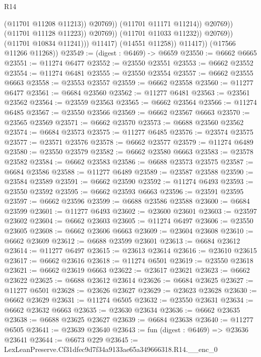 \begin{lexlean}{R14}
\begin{coremodule}
                                          (@11701 @11208 @11213))
                                        @20769))
                                    (@11701 @11171 @11214))
                                  @20769))
                              (@11701 @11128 @11223))
                            @20769))
                        (@11701 @11033 @11232))
                      @20769))
                  (@11701 @10834 @11241)))
              @11417)
            (@14551 @11258))
          @11417))
      (@17566 @11266 @11268))
@23549 := (digest : @6469) -> @6659
@23550 := @6662 @6665
@23551 := @11274 @6477
@23552 := @23550 @23551
@23553 := @6662 @23552
@23554 := @11274 @6481
@23555 := @23550 @23554
@23557 := @6662 @23555 @6663
@23558 := @23553 @23557
@23559 := @6662 @23558
@23560 := @11277 @6477
@23561 := @6684 @23560
@23562 := @11277 @6481
@23563 := @23561 @23562
@23564 := @23559 @23563
@23565 := @6662 @23564
@23566 := @11274 @6485
@23567 := @23550 @23566
@23569 := @6662 @23567 @6663
@23570 := @23565 @23569
@23571 := @6662 @23570
@23573 := @6688 @23560 @23562
@23574 := @6684 @23573
@23575 := @11277 @6485
@23576 := @23574 @23575
@23577 := @23571 @23576
@23578 := @6662 @23577
@23579 := @11274 @6489
@23580 := @23550 @23579
@23582 := @6662 @23580 @6663
@23583 := @23578 @23582
@23584 := @6662 @23583
@23586 := @6688 @23573 @23575
@23587 := @6684 @23586
@23588 := @11277 @6489
@23589 := @23587 @23588
@23590 := @23584 @23589
@23591 := @6662 @23590
@23592 := @11274 @6493
@23593 := @23550 @23592
@23595 := @6662 @23593 @6663
@23596 := @23591 @23595
@23597 := @6662 @23596
@23599 := @6688 @23586 @23588
@23600 := @6684 @23599
@23601 := @11277 @6493
@23602 := @23600 @23601
@23603 := @23597 @23602
@23604 := @6662 @23603
@23605 := @11274 @6497
@23606 := @23550 @23605
@23608 := @6662 @23606 @6663
@23609 := @23604 @23608
@23610 := @6662 @23609
@23612 := @6688 @23599 @23601
@23613 := @6684 @23612
@23614 := @11277 @6497
@23615 := @23613 @23614
@23616 := @23610 @23615
@23617 := @6662 @23616
@23618 := @11274 @6501
@23619 := @23550 @23618
@23621 := @6662 @23619 @6663
@23622 := @23617 @23621
@23623 := @6662 @23622
@23625 := @6688 @23612 @23614
@23626 := @6684 @23625
@23627 := @11277 @6501
@23628 := @23626 @23627
@23629 := @23623 @23628
@23630 := @6662 @23629
@23631 := @11274 @6505
@23632 := @23550 @23631
@23634 := @6662 @23632 @6663
@23635 := @23630 @23634
@23636 := @6662 @23635
@23638 := @6688 @23625 @23627
@23639 := @6684 @23638
@23640 := @11277 @6505
@23641 := @23639 @23640
@23643 := fun (digest : @6469) => @23636 @23641
@23644 := @6673 @229
@23645 := LexLeanPreserve.Cf31dfec9d7f34a9133ae65a349666318.R14.__enc_0

\end{coremodule}
\end{lexlean}

